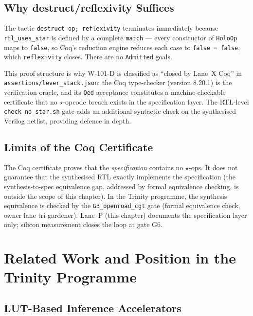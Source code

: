 \subsection{Why destruct/reflexivity Suffices}

The tactic \texttt{destruct op; reflexivity} terminates immediately
because \texttt{rtl\_uses\_star} is defined by a complete \texttt{match}
--- every constructor of \texttt{HoloOp} maps to \texttt{false}, so
Coq's reduction engine reduces each case to \texttt{false = false},
which \texttt{reflexivity} closes.  There are no \texttt{Admitted} goals.

This proof structure is why W-101-D is classified as ``closed by Lane~X Coq''
in \texttt{assertions/lever\_stack.json}: the Coq type-checker (version 8.20.1)
is the verification oracle, and its \texttt{Qed} acceptance constitutes a
machine-checkable certificate that no \(\star\)-opcode breach exists in the
specification layer.  The RTL-level \texttt{check\_no\_star.sh} gate adds an
additional syntactic check on the synthesised Verilog netlist, providing
defence in depth.

\subsection{Limits of the Coq Certificate}

The Coq certificate proves that the \emph{specification} contains no
\(\star\)-ops.  It does not guarantee that the synthesised RTL exactly
implements the specification (the synthesis-to-spec equivalence gap,
addressed by formal equivalence checking, is outside the scope of this
chapter).  In the Trinity programme, the synthesis equivalence is checked
by the \texttt{G3\_openroad\_cgt} gate (formal equivalence check,
owner lane tri-gardener).  Lane~P (this chapter) documents the specification
layer only; silicon measurement closes the loop at gate G6.

\section{Related Work and Position in the Trinity Programme}
\label{sec:related}

\subsection{LUT-Based Inference Accelerators}

